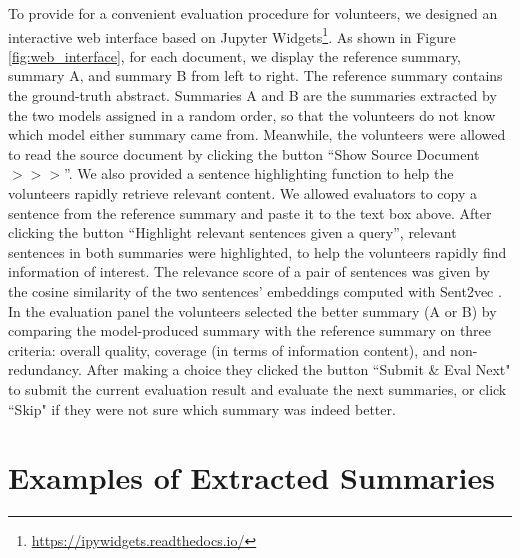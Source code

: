 \documentclass[11pt]{article}
\begin{document}
To provide for a convenient evaluation procedure for volunteers, we designed an interactive web interface based on Jupyter Widgets\footnote{\url{https://ipywidgets.readthedocs.io/}}. As shown in Figure \ref{fig:web_interface}, for each document, we display the reference summary, summary A, and summary B from left to right. The reference summary contains the ground-truth abstract. Summaries A and B are the summaries extracted by the two models assigned in a random order, so that the volunteers do not know which model either summary came from. Meanwhile, the volunteers were allowed to read the source document by clicking the button ``Show Source Document $>>>$''. We also provided a sentence highlighting function to help the volunteers rapidly retrieve relevant content. We allowed evaluators to copy a sentence from the reference summary and paste it to the text box above. After clicking the button ``Highlight relevant sentences given a query'', relevant sentences in both summaries were highlighted, to help the volunteers rapidly find information of interest. The relevance score of a pair of sentences was given by the cosine similarity of the two sentences' embeddings computed with Sent2vec \cite{pgj2017unsup}. In the evaluation panel the volunteers selected the better summary (A or B) by comparing the model-produced summary with the reference summary on three criteria: overall quality, coverage (in terms of information content), and non-redundancy. After making a choice they clicked the button ``Submit \& Eval Next" to submit the current evaluation result and evaluate the next summaries, or click ``Skip" if they were not sure which summary was indeed better.


\section{Examples of Extracted Summaries}
\end{document}
